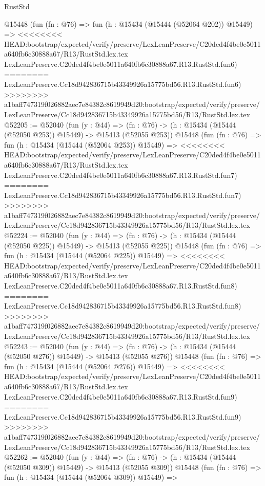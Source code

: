 \begin{lexlean}{RustStd}
\begin{coremodule}
{\begin{coremodule}
{{{{{{{{{{{{{{{{{{{{{{{{{{{{{{{{{{{{{{{{{{{{{{{{{{{{{{{{{{{{    @15448
    (fun (fn : @76) =>
    fun (h : @15434 (@15444 (@52064 @202)) @15449) =>
<<<<<<<< HEAD:bootstrap/expected/verify/preserve/LexLeanPreserve/C20ded4f4be0e5011a640fb6c30888a67/R13/RustStd.lex.tex
    LexLeanPreserve.C20ded4f4be0e5011a640fb6c30888a67.R13.RustStd.fun6)
========
    LexLeanPreserve.Cc18d942836715b43349926a15775bd56.R13.RustStd.fun6)
>>>>>>>> a1baff747319f026882aec7e84382c8619949d20:bootstrap/expected/verify/preserve/LexLeanPreserve/Cc18d942836715b43349926a15775bd56/R13/RustStd.lex.tex
@52205 := @52040
    (fun (y : @44) =>
    (fn : @76) -> (h : @15434 (@15444 (@52050 @253)) @15449) -> @15413 (@52055 @253))
    @15448
    (fun (fn : @76) =>
    fun (h : @15434 (@15444 (@52064 @253)) @15449) =>
<<<<<<<< HEAD:bootstrap/expected/verify/preserve/LexLeanPreserve/C20ded4f4be0e5011a640fb6c30888a67/R13/RustStd.lex.tex
    LexLeanPreserve.C20ded4f4be0e5011a640fb6c30888a67.R13.RustStd.fun7)
========
    LexLeanPreserve.Cc18d942836715b43349926a15775bd56.R13.RustStd.fun7)
>>>>>>>> a1baff747319f026882aec7e84382c8619949d20:bootstrap/expected/verify/preserve/LexLeanPreserve/Cc18d942836715b43349926a15775bd56/R13/RustStd.lex.tex
@52224 := @52040
    (fun (y : @44) =>
    (fn : @76) -> (h : @15434 (@15444 (@52050 @225)) @15449) -> @15413 (@52055 @225))
    @15448
    (fun (fn : @76) =>
    fun (h : @15434 (@15444 (@52064 @225)) @15449) =>
<<<<<<<< HEAD:bootstrap/expected/verify/preserve/LexLeanPreserve/C20ded4f4be0e5011a640fb6c30888a67/R13/RustStd.lex.tex
    LexLeanPreserve.C20ded4f4be0e5011a640fb6c30888a67.R13.RustStd.fun8)
========
    LexLeanPreserve.Cc18d942836715b43349926a15775bd56.R13.RustStd.fun8)
>>>>>>>> a1baff747319f026882aec7e84382c8619949d20:bootstrap/expected/verify/preserve/LexLeanPreserve/Cc18d942836715b43349926a15775bd56/R13/RustStd.lex.tex
@52243 := @52040
    (fun (y : @44) =>
    (fn : @76) -> (h : @15434 (@15444 (@52050 @276)) @15449) -> @15413 (@52055 @276))
    @15448
    (fun (fn : @76) =>
    fun (h : @15434 (@15444 (@52064 @276)) @15449) =>
<<<<<<<< HEAD:bootstrap/expected/verify/preserve/LexLeanPreserve/C20ded4f4be0e5011a640fb6c30888a67/R13/RustStd.lex.tex
    LexLeanPreserve.C20ded4f4be0e5011a640fb6c30888a67.R13.RustStd.fun9)
========
    LexLeanPreserve.Cc18d942836715b43349926a15775bd56.R13.RustStd.fun9)
>>>>>>>> a1baff747319f026882aec7e84382c8619949d20:bootstrap/expected/verify/preserve/LexLeanPreserve/Cc18d942836715b43349926a15775bd56/R13/RustStd.lex.tex
@52262 := @52040
    (fun (y : @44) =>
    (fn : @76) -> (h : @15434 (@15444 (@52050 @309)) @15449) -> @15413 (@52055 @309))
    @15448
    (fun (fn : @76) =>
    fun (h : @15434 (@15444 (@52064 @309)) @15449) =>
}}}}}}}}}}}}}}}}}}}}}}}}}}}}}}}}}}}}}}}}}}}}}}}}}}}}}}}}}}}}
\end{coremodule}}
\end{coremodule}
\end{lexlean}
